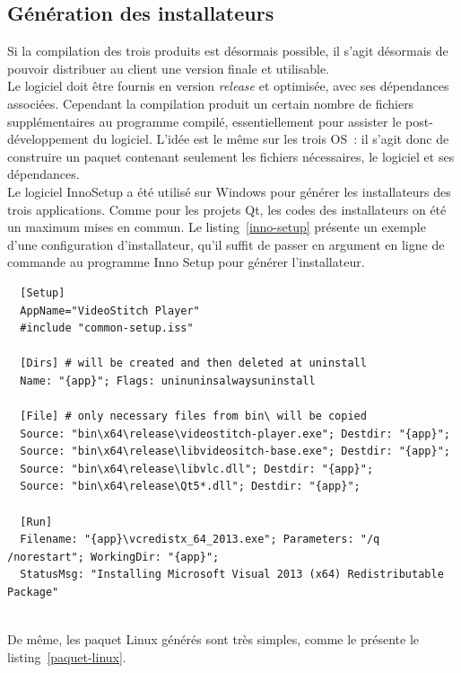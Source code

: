 \subsection{Génération des installateurs}
Si la compilation des trois produits est désormais possible, il s'agit désormais
de pouvoir distribuer au client une version finale et utilisable.\\
Le logiciel doit être fournis en version \textit{release} et optimisée, avec ses dépendances associées.
Cependant la compilation produit un certain nombre de fichiers supplémentaires au 
programme compilé, essentiellement pour assister le post-développement du logiciel. 
L'idée est le même sur les trois OS~: il s'agit donc de construire un paquet contenant 
seulement les fichiers nécessaires, le logiciel et ses dépendances.\\
\newline
Le logiciel InnoSetup a été utilisé sur Windows pour générer les installateurs 
des trois applications. Comme pour les projets Qt, les codes des installateurs
on été un maximum mises en commun. Le listing~\ref{inno-setup} présente un exemple
d'une configuration d'installateur, qu'il suffit de passer en argument en ligne
de commande au programme Inno Setup pour générer l'installateur.
\begin{listing}
  \begin{verbatim}
  [Setup]
  AppName="VideoStitch Player"
  #include "common-setup.iss"

  [Dirs] # will be created and then deleted at uninstall
  Name: "{app}"; Flags: uninuninsalwaysuninstall

  [File] # only necessary files from bin\ will be copied
  Source: "bin\x64\release\videostitch-player.exe"; Destdir: "{app}";
  Source: "bin\x64\release\libvideositch-base.exe"; Destdir: "{app}";
  Source: "bin\x64\release\libvlc.dll"; Destdir: "{app}";
  Source: "bin\x64\release\Qt5*.dll"; Destdir: "{app}";

  [Run]
  Filename: "{app}\vcredistx_64_2013.exe"; Parameters: "/q /norestart"; WorkingDir: "{app}";
  StatusMsg: "Installing Microsoft Visual 2013 (x64) Redistributable Package"
  \end{verbatim}
  \caption{Extrait de la configuration de l'installateur de VideoStitch Player}
  \label{inno-setup}
\end{listing}
\ \\
De même, les paquet Linux générés sont très simples, comme le présente le listing~\ref{paquet-linux}.
\begin{listing}
  \caption{Paquet Linux de VideoStitch Player}
  \label{paquet-linux}
\end{listing}

